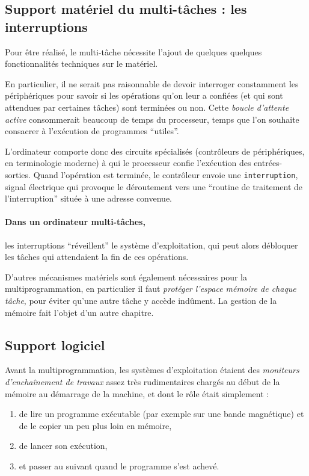 \begin{multicols}{2}
\subsection{Support matériel du multi-tâches : les interruptions}

Pour être réalisé, le multi-tâche nécessite l'ajout
de quelques quelques fonctionnalités techniques sur le matériel.

En particulier, il ne serait pas raisonnable de devoir interroger
constamment les périphériques pour savoir si les opérations qu'on leur
a confiées (et qui sont attendues par certaines tâches) sont terminées
ou non. Cette \emph{boucle d'attente active} consommerait beaucoup de
temps du processeur, temps que l'on souhaite consacrer à l'exécution de
programmes ``utiles''.

L'ordinateur comporte donc des circuits spécialisés (contrôleurs de
périphériques, en terminologie moderne) à qui le processeur confie
l'exécution des entrées-sorties. Quand l'opération est terminée, le
contrôleur envoie une \texttt{interruption}, signal électrique qui
provoque le déroutement vers une ``routine de traitement de
l'interruption'' située à une adresse convenue.

\paragraph{Dans un ordinateur multi-tâches,}  les interruptions ``réveillent'' le
système d'exploitation, qui peut alors débloquer les tâches qui
attendaient la fin de ces opérations.

D'autres mécanismes matériels sont également nécessaires pour la
multiprogrammation, en particulier il faut \emph{protéger l'espace mémoire
de chaque tâche}, pour éviter qu'une autre tâche y accède indûment.
La gestion de la mémoire fait l'objet d'un autre chapitre.

\subsection{Support logiciel}

Avant la multiprogrammation, les systèmes d'exploitation étaient des
\emph{moniteurs d'enchaînement de travaux} assez très rudimentaires
chargés au début de la mémoire au démarrage de la machine, et dont le
rôle était simplement : 
\begin{enumerate}
\item de lire un programme exécutable (par exemple sur une bande magnétique) et de le copier
un peu plus loin en mémoire,
\item de lancer son exécution,
\item et passer au suivant quand le programme s'est achevé.
\end{enumerate}


\end{multicols}
